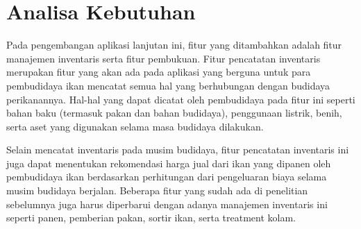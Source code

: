 \section{Analisa Kebutuhan}

Pada pengembangan aplikasi lanjutan ini, fitur yang ditambahkan adalah fitur manajemen inventaris serta fitur pembukuan. Fitur pencatatan inventaris merupakan fitur yang akan ada pada aplikasi yang berguna untuk para pembudidaya ikan mencatat semua hal yang berhubungan dengan budidaya perikanannya. Hal-hal yang dapat dicatat oleh pembudidaya pada fitur ini seperti bahan baku (termasuk pakan dan bahan budidaya), penggunaan listrik, benih, serta aset yang digunakan selama masa budidaya dilakukan.

Selain mencatat inventaris pada musim budidaya, fitur pencatatan inventaris ini juga dapat menentukan rekomendasi harga jual dari ikan yang dipanen oleh pembudidaya ikan berdasarkan perhitungan dari pengeluaran biaya selama musim budidaya berjalan. Beberapa fitur yang sudah ada di penelitian sebelumnya juga harus diperbarui dengan adanya manajemen inventaris ini seperti panen, pemberian pakan, sortir ikan, serta treatment kolam.

